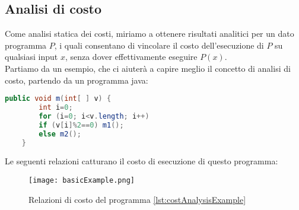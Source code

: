 \documentclass[../../main.tex]{subfiles}
\begin{document}
\subsection{Analisi di costo}
Come analisi statica dei costi, miriamo a ottenere risultati analitici per un dato programma $P$, i quali consentano di vincolare il costo dell'esecuzione di $P$ su qualsiasi input $x$, senza dover effettivamente eseguire $P(x)$.\autocite{albert2011closed}\\
Partiamo da un esempio, che ci aiuterà a capire meglio il concetto di analisi di costo, partendo da un programma java:\
\newpage
\begin{lstlisting}[language=Java, caption={Esempio di Analisi di Costo}, label={lst:costAnalysisExample}]
    public void m(int[ ] v) {
        int i=0;
        for (i=0; i<v.length; i++)
        if (v[i]%2==0) m1();
        else m2();
    }
\end{lstlisting}
Le seguenti relazioni catturano il costo di esecuzione di questo programma:
\begin{figure}[H]
    \centering
    \texttt{[image: basicExample.png]}
    \caption{Relazioni di costo del programma \ref{lst:costAnalysisExample}}
\end{figure}
\end{document}
